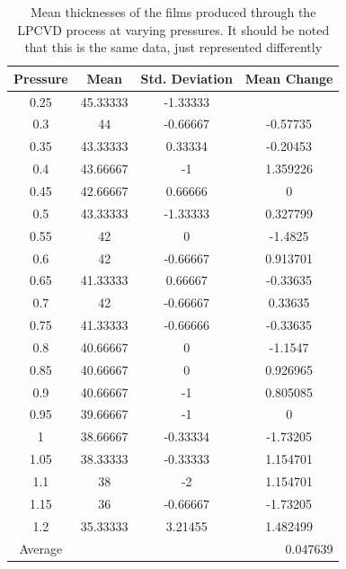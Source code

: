 \documentclass[letterpaper]{article}
\begin{document}
\begin{table}[H]
 \centering
 \begin{tabular}{|c|c|c|c|}
  \hline
  Pressure & Mean                          & Std. Deviation & Mean Change \\ \hline
  0.25     & 45.33333                      & -1.33333       &             \\ \hline
  0.3      & 44                            & -0.66667       & -0.57735    \\ \hline
  0.35     & 43.33333                      & 0.33334        & -0.20453    \\ \hline
  0.4      & 43.66667                      & -1             & 1.359226    \\ \hline
  0.45     & 42.66667                      & 0.66666        & 0           \\ \hline
  0.5      & 43.33333                      & -1.33333       & 0.327799    \\ \hline
  0.55     & 42                            & 0              & -1.4825     \\ \hline
  0.6      & 42                            & -0.66667       & 0.913701    \\ \hline
  0.65     & 41.33333                      & 0.66667        & -0.33635    \\ \hline
  0.7      & 42                            & -0.66667       & 0.33635     \\ \hline
  0.75     & 41.33333                      & -0.66666       & -0.33635    \\ \hline
  0.8      & 40.66667                      & 0              & -1.1547     \\ \hline
  0.85     & 40.66667                      & 0              & 0.926965    \\ \hline
  0.9      & 40.66667                      & -1             & 0.805085    \\ \hline
  0.95     & 39.66667                      & -1             & 0           \\ \hline
  1        & 38.66667                      & -0.33334       & -1.73205    \\ \hline
  1.05     & 38.33333                      & -0.33333       & 1.154701    \\ \hline
  1.1      & 38                            & -2             & 1.154701    \\ \hline
  1.15     & 36                            & -0.66667       & -1.73205    \\ \hline
  1.2      & 35.33333                      & 3.21455        & 1.482499    \\ \hline
  Average  & \multicolumn{3}{r|}{0.047639}                                \\ \hline
 \end{tabular}
 \caption{Mean thicknesses of the films produced through the LPCVD process at varying pressures. It should be noted that this is the same data, just represented differently}
 \label{pressurestat}
\end{table}
\end{document}
